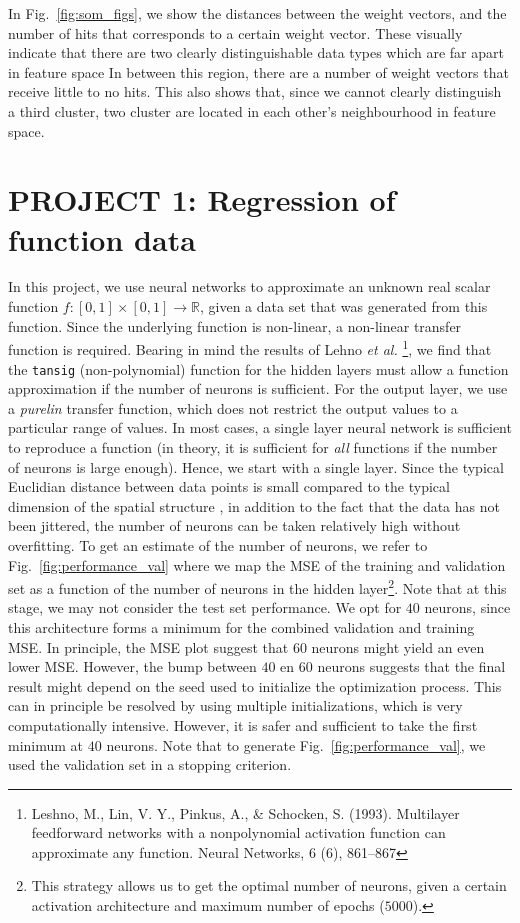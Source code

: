\documentclass[pdftex,11pt,a4paper]{article}
\begin{document}
In Fig.~\ref{fig:som_figs}, we show the distances between the weight vectors, and the number of hits that corresponds to a certain weight vector. These visually indicate that there are two clearly distinguishable data types which are far apart in feature space 
In between this region, there are a number of weight vectors that receive little to no hits. This also shows that, since we cannot clearly distinguish a third cluster, two cluster are located in each other's neighbourhood in feature space.

\FloatBarrier
\newpage

\section{PROJECT 1: Regression of function data}\label{sec:regression}
In this project, we use neural networks to approximate an unknown real scalar function $f:[0,1]\times[0,1] \rightarrow \mathbb{R}$, given a data set that was generated from this function. Since the underlying function is non-linear, a non-linear transfer function is required. Bearing in mind the results of Lehno \textit{et al.} \footnote{Leshno, M., Lin, V. Y., Pinkus, A., \& Schocken, S. (1993). Multilayer feedforward networks with a nonpolynomial activation function can approximate any function. Neural Networks, 6 (6), 861–867}, we find that the \texttt{tansig} (non-polynomial) function for the hidden layers must allow a function approximation if the number of neurons is sufficient. For the output layer, we use a \textit{purelin} transfer function, which does not restrict the output values to a particular range of values. In most cases, a single layer neural network is sufficient to reproduce a function (in theory, it is sufficient for \textit{all} functions if the number of neurons is large enough). Hence, we start with a single layer. Since the typical Euclidian distance between data points is small compared to the typical dimension of the spatial structure ,  in addition to the fact that the data has not been jittered, the number of neurons can be taken relatively high without overfitting. To get an estimate of the number of neurons, we refer to Fig.~\ref{fig:performance_val} where we map the MSE of the training and validation set as a function of the number of neurons in the hidden layer\footnote{This strategy allows us to get the optimal number of neurons, given a certain activation architecture and maximum number of epochs ($5000$).}. Note that at this stage, we may not consider the test set performance. We opt for $40$ neurons, since this architecture forms a minimum for the combined validation and training MSE. In principle, the MSE plot suggest that $60$ neurons might yield an even lower MSE. However, the bump between $40$ en $60$ neurons suggests that the final result might depend on the seed used to initialize the optimization process. This can in principle be resolved by using multiple initializations, which is very computationally intensive. However, it is safer and sufficient to take the first minimum at $40$ neurons. Note that to generate Fig.~\ref{fig:performance_val}, we used the validation set in a stopping criterion. 
\end{document}
